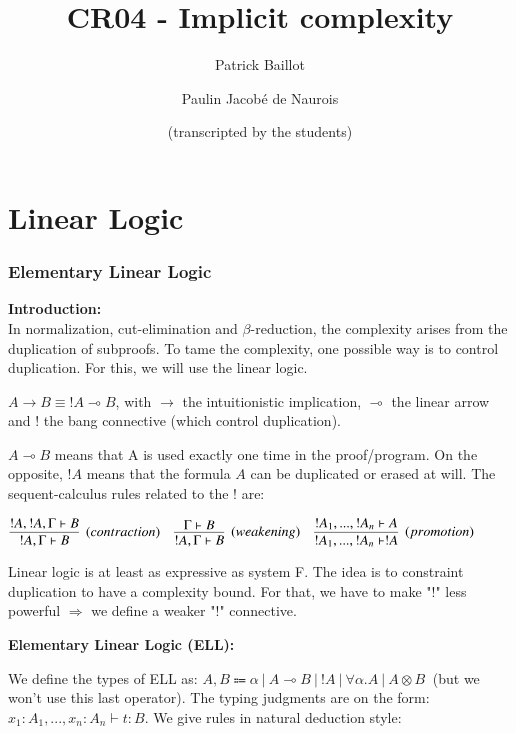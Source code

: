 \documentclass[a4paper,10pt]{article}
\author{Patrick Baillot \and Paulin Jacobé de Naurois \\ \and (transcripted by the students)}
\title{CR04 - Implicit complexity}
\newcommand{\impl}{\rightarrow}	%
\newcommand{\limpl}{\multimap}  %
\begin{document}
\maketitle



\part{Linear Logic}




\section{Elementary Linear Logic}

\textbf{Introduction:}\\
In normalization, cut-elimination and $\beta$-reduction, the complexity arises from the duplication of subproofs. To tame the complexity, one possible way is to control duplication. For this, we will use the linear logic.

$A \impl B \equiv ! A \limpl B$, with $\impl$ the intuitionistic implication, $\limpl$ the linear arrow and $!$ the bang connective (which control duplication).

$A \limpl B$ means that A is used exactly one time in the proof/program. On the opposite, $!A$ means that the formula $A$ can be duplicated or erased at will. The sequent-calculus rules related to the $!$ are:
\begin{center}
$	\infer[(contraction)]{!A, \Gamma \vdash B}{!A, !A, \Gamma \vdash B} \quad
	\infer[(weakening)]{!A, \Gamma \vdash B}{\Gamma \vdash B} \quad
	\infer[(promotion)]{!A_{1}, ... , !A_{n} \vdash !A }{!A_{1}, ... , !A_{n} \vdash A}
$
\end{center}

\par Linear logic is at least as expressive as system F. The idea is to constraint duplication to have a complexity bound. For that, we have to make "$!$" less powerful $\Rightarrow$ we define a weaker "$!$" connective.


\vspace{0.3cm}
\textbf{Elementary Linear Logic (ELL):}
\par We define the types of ELL as: $A,B \Coloneqq \alpha \ | \ A \limpl B \ | \ !A \ | \ \forall \alpha.A \ | \ A \otimes B \ $ (but we won't use this last operator). The typing judgments are on the form: $x_1 : A_1, ..., x_n : A_n \vdash t:B$. We give rules in natural deduction style:
\end{document}
